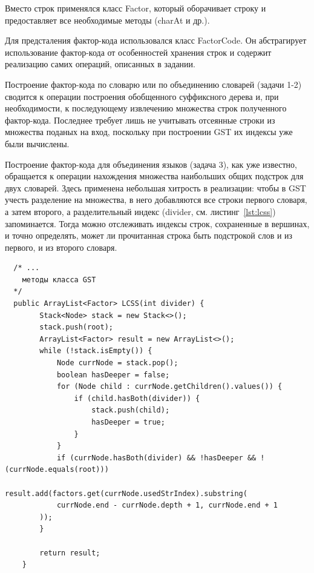 \documentclass[14pt, russian]{scrartcl}
\begin{document}
Вместо строк применялся класс Factor, который оборачивает строку и предоставляет все необходимые методы (charAt и др.).
 
Для предсталения фактор-кода использовался класс FactorCode. Он абстрагирует использование фактор-кода от особенностей хранения строк и содержит реализацию самих операций, описанных в задании. 

Построение фактор-кода по словарю или по объединению словарей (задачи 1-2) сводится к операции построения обобщенного суффиксного дерева
и, при необходимости, к последующему извлечению множества строк полученного фактор-кода. Последнее требует лишь не учитывать отсеянные строки из множества поданых на вход, поскольку при построении GST их индексы уже были вычислены.


Построение фактор-кода для объединения языков (задача 3), как уже известно, обращается к операции нахождения множества наибольших общих подстрок для двух словарей. Здесь применена небольшая хитрость в реализации: чтобы в GST
учесть разделение на множества, в него добавляются все строки первого словаря, а затем второго, а разделительный индекс (divider, см. листинг~\ref{lst:lcss}) 
запоминается. Тогда можно отслеживать индексы строк, сохраненные в вершинах, и точно определять, может ли прочитанная строка быть подстрокой слов и из первого, и из второго словаря. 

\begin{listing}[htb!]
\caption{Нахождение наибольших общих подстрок}
\label{lst:lcss}
\begin{verbatim}
  /* ...
    методы класса GST 
  */
  public ArrayList<Factor> LCSS(int divider) {
        Stack<Node> stack = new Stack<>();
        stack.push(root);
        ArrayList<Factor> result = new ArrayList<>();
        while (!stack.isEmpty()) {
            Node currNode = stack.pop();
            boolean hasDeeper = false;
            for (Node child : currNode.getChildren().values()) {
                if (child.hasBoth(divider)) {
                    stack.push(child);
                    hasDeeper = true;
                }
            }
            if (currNode.hasBoth(divider) && !hasDeeper && !(currNode.equals(root)))
                result.add(factors.get(currNode.usedStrIndex).substring(
		    currNode.end - currNode.depth + 1, currNode.end + 1
		));
        }

        return result;
    }
\end{verbatim}
\end{listing}
 
\end{document}
